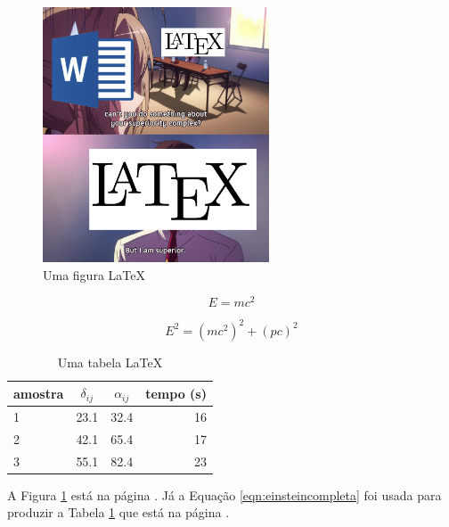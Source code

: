 \documentclass[12pt]{article}
\begin{document}
\begin{figure}
	\centering
	\includegraphics[width=0.6\textwidth]{meme_superior.png}
	\caption{Uma figura \LaTeX}
	\label{fig:meme}
\end{figure}

\begin{equation}
	E = m c ^2
\end{equation}

\begin{equation}
	E^2 = (m c^2)^2 + (p c)^2
	\label{eqn:einsteincompleta}
\end{equation}
\begin{table}
	\centering
	\begin{tabular}{l c c r}
		\hline
		amostra & $\delta_{ij}$ & $\alpha_{ij}$
			& tempo (s) \\
		\hline
		1 & 23.1 & 32.4 & 16 \\
		2 & 42.1 & 65.4 & 17 \\
		3 & 55.1 & 82.4 & 23 \\
		\hline
	\end{tabular}
	\caption{Uma tabela \LaTeX}
	\label{tab:alpha_delta}
\end{table}

A Figura \ref{fig:meme} está na página \pageref{fig:meme}. Já a Equação \ref{eqn:einsteincompleta} foi usada para produzir a Tabela \ref{tab:alpha_delta} que está na página \pageref{tab:alpha_delta}.
\end{document}
